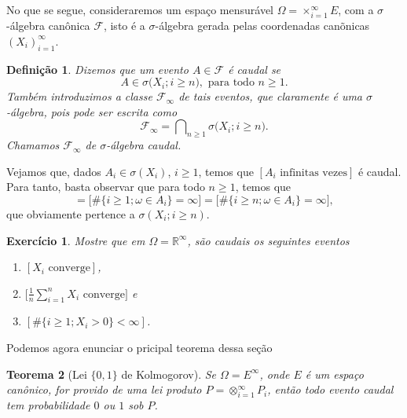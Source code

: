 \documentclass[reqno, final]{book}
\newcommand*\1{\mathds{1}}
\newtheorem{theorem}{Teorema}[section]
\newtheorem{definition}[theorem]{Definição}
\newtheorem{exercise}[example]{Exercício}
\DeclareMathOperator*{\mcap}{{\textstyle \bigcap}}
\begin{document}
No que se segue, consideraremos um espaço mensurável $\Omega = \times_{i=1}^\infty E$, com a $\sigma$-álgebra canônica $\mathcal{F}$, isto é a $\sigma$-álgebra gerada pelas coordenadas canõnicas $(X_i)_{i=1}^\infty$.
\begin{definition}
  Dizemos que um evento $A \in \mathcal{F}$ é caudal se
  \begin{equation}
    A \in \sigma\big( X_i; i \geq n\big), \text{ para todo $n \geq 1$}.
  \end{equation}
  Também introduzimos a classe $\mathcal{F}_\infty$ de tais eventos, que claramente é uma $\sigma$-álgebra, pois pode ser escrita como
  \begin{equation}
    \mathcal{F}_\infty = \mcap_{n \geq 1} \sigma\big( X_i; i \geq n\big).
  \end{equation}
  Chamamos $\mathcal{F}_\infty$ de $\sigma$-álgebra caudal. 
\end{definition}

Vejamos que, dados $A_i \in \sigma(X_i)$, $i \geq 1$, temos que $[A_i \text{ infinitas vezes}]$ é caudal.
Para tanto, basta observar que para todo $n \geq 1$, temos que
\begin{equation*}
  [A_i \text{ infinitas vezes}] = \big[\#\{i \geq 1; \omega \in A_i\} = \infty\big] = \big[\#\{i \geq n; \omega \in A_i\} = \infty\big],
\end{equation*}
que obviamente pertence a $\sigma(X_i; i \geq n)$.

\begin{exercise}
  Mostre que em $\Omega = \mathbb{R}^{\infty}$, são caudais os seguintes eventos
  \begin{enumerate}[\quad a)]
  \item $[X_i \text{ converge}]$,
  \item $\big[\tfrac{1}{n} \sum_{i=1}^n X_i \text{ converge}\big]$ e
  \item $[\#\{i \geq 1; X_i > 0\} < \infty]$.
  \end{enumerate}
\end{exercise}

Podemos agora enunciar o pricipal teorema dessa seção

\begin{theorem}[Lei $\{0,1\}$ de Kolmogorov]
  Se $\Omega = E^{\infty}$, onde $E$ é um espaço canônico, for provido de uma lei produto $P = \otimes_{i=1}^\infty P_i$, então todo evento caudal tem probabilidade $0$ ou $1$ sob $P$.
\end{theorem}
\end{document}
